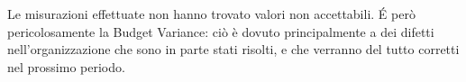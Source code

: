 Le misurazioni effettuate non hanno trovato valori non accettabili.\newline
\'E però pericolosamente la Budget Variance: ciò è dovuto principalmente a dei difetti nell'organizzazione che sono in parte stati risolti, e che verranno del tutto corretti nel prossimo periodo.